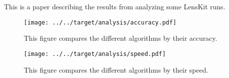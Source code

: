 \documentclass{article}
\begin{document}
This is a paper describing the results from analyzing some LensKit runs.

\begin{figure}
\begin{center}
\texttt{[image: ../../target/analysis/accuracy.pdf]}
\caption{This figure compares the different algorithms by their accuracy.}
\end{center}
\end{figure}

\begin{figure}  
\begin{center}
\texttt{[image: ../../target/analysis/speed.pdf]}
\caption{This figure compares the different algorithms by their speed.}
\end{center}
\end{figure}
\end{document}
